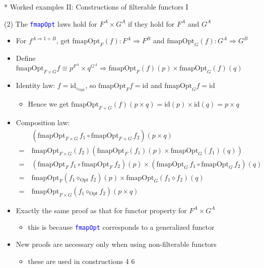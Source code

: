 \documentclass[english]{beamer}
\begin{document}
\begin{frame}{{*} Worked examples II: Constructions of filterable functors I}

(2) The \texttt{\textcolor{blue}{\footnotesize{}fmapOpt}} laws hold
for $F^{A}\times G^{A}$ if they hold for $F^{A}$ and $G^{A}$
\begin{itemize}
\item For $f^{A\Rightarrow1+B}$, get {\footnotesize{}$\text{fmapOpt}_{F}(f):F^{A}\Rightarrow F^{B}$
}and {\footnotesize{}$\text{fmapOpt}_{G}(f):G^{A}\Rightarrow G^{B}$}{\footnotesize \par}
\item Define {\footnotesize{}$\text{fmapOpt}_{F\times G}f\equiv p^{F^{A}}\times q^{G^{A}}\Rightarrow\text{fmapOpt}_{F}(f)(p)\times\text{fmapOpt}_{G}(f)(q)$}{\footnotesize \par}
\item Identity law: $f=\text{id}_{\diamond_{\text{Opt}}}$, so {\footnotesize{}$\text{fmapOpt}_{F}f=\text{id}$}
and {\footnotesize{}$\text{fmapOpt}_{G}f=\text{id}$}{\footnotesize \par}
\begin{itemize}
\item Hence we get $\text{fmapOpt}_{F+G}(f)(p\times q)=\text{id}(p)\times\text{id}(q)=p\times q$
\end{itemize}
\item Composition law:{\footnotesize{}
\begin{align*}
 & (\text{fmapOpt}_{F\times G}\,f_{1}\circ\text{fmapOpt}_{F+G}\,f_{2})(p\times q)\\
=\  & \text{fmapOpt}_{F\times G}(f_{2})\left(\text{fmapOpt}_{F}(f_{1})(p)\times\text{fmapOpt}_{G}(f_{1})(q)\right)\\
=\  & (\text{fmapOpt}_{F}\,f_{1}\circ\text{fmapOpt}_{F}\,f_{2})(p)\times\left(\text{fmapOpt}_{G}\,f_{1}\circ\text{fmapOpt}_{G}\,f_{2}\right)(q)\\
=\  & \text{fmapOpt}_{F}(f_{1}\diamond_{\text{Opt}}f_{2})(p)\times\text{fmapOpt}_{G}(f_{1}\diamond f_{2})(q)\\
=\  & \text{fmapOpt}_{F\times G}(f_{1}\diamond_{\text{Opt}}f_{2})(p\times q)
\end{align*}
}{\footnotesize \par}
\item Exactly the same proof as that for functor property for $F^{A}\times G^{A}$
\begin{itemize}
\item this is because \texttt{\textcolor{blue}{\footnotesize{}fmapOpt}}
corresponds to a generalized functor
\end{itemize}
\item New proofs are necessary only when using non-filterable functors
\begin{itemize}
\item these are used in constructions 4 \textendash{} 6
\end{itemize}
\end{itemize}
\end{frame}
\end{document}
